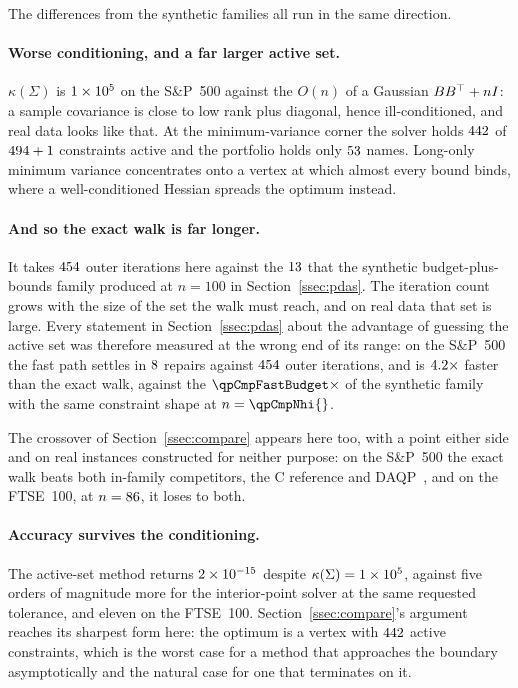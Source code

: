 The differences from the synthetic families all run in the same direction.

\paragraph{Worse conditioning, and a far larger active set.} $\kappa(\Sigma)$ is
$1\times 10^{5}$ on the S\&P~500 against the $O(n)$ of a Gaussian $BB^{\top} + nI$: a
sample covariance is close to low rank plus diagonal, hence ill-conditioned, and
real data looks like that. At the minimum-variance
corner the solver holds $442{}$ of $494{} + 1$ constraints active
and the portfolio holds only $53{}$ names. Long-only minimum variance
concentrates onto a vertex at which almost every bound binds, where a
well-conditioned Hessian spreads the optimum instead.

\paragraph{And so the exact walk is far longer.} It takes $454{}$ outer
iterations here against the $13{}$ that the synthetic
budget-plus-bounds family produced at $n = 100$ in Section~\ref{ssec:pdas}. The
iteration count grows with the size of the set the walk must reach, and on real
data that set is large. Every statement in Section~\ref{ssec:pdas} about the
advantage of guessing the active set was therefore measured at the wrong end of
its range: on the S\&P~500 the fast path settles in $8{}$ repairs
against $454{}$ outer iterations, and is $4.2\times$ faster
than the exact walk, against the $\qpCmpFastBudget\times$ of the synthetic family
with the same constraint shape at $n = \qpCmpNhi{}$.

The crossover of Section~\ref{ssec:compare} appears here too, with a point either
side and on real instances constructed for neither purpose: on the S\&P~500 the
exact walk beats both in-family competitors, the C reference and
DAQP~\cite{arnstrom2022daqp}, and on the FTSE~100, at $n = 86{}$, it loses
to both.

\paragraph{Accuracy survives the conditioning.} The active-set method returns
$2\times 10^{-15}$ despite $\kappa(\Sigma) = 1\times 10^{5}$, against five orders of
magnitude more for the interior-point solver at the same requested tolerance, and
eleven on the FTSE~100. Section~\ref{ssec:compare}'s argument reaches its sharpest
form here: the optimum is a vertex with $442{}$ active
constraints, which is the worst case for a method that approaches the boundary
asymptotically and the natural case for one that terminates on it.

